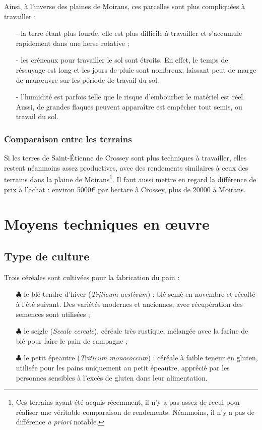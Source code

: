 \documentclass{article}
\begin{document}
Ainsi, à l'inverse des plaines de Moirans, ces parcelles sont plus compliquées à travailler : 
\begin{itemize}
	\item[- ] la terre étant plus lourde, elle est plus difficile à travailler et s'accumule rapidement dans une herse rotative ;
	\item[- ] les créneaux pour travailler le sol sont étroits. En effet, le temps de réssuyage est long et les jours de pluie sont nombreux, laissant peut de marge de manœuvre sur les période de travail du sol. 
	\item[- ] l'humidité est parfois telle que le risque d'embourber le matériel est réel. Aussi, de grandes flaques peuvent apparaître est empêcher tout semis, ou travail du sol.
\end{itemize}

\subsubsection*{Comparaison entre les terrains}

Si les terres de Saint-Étienne de Crossey sont plus techniques à travailler, elles restent néanmoins assez productives, avec des rendements similaires à ceux des terrains dans la plaine de Moirans\footnote{Ces terrains ayant été acquis récemment, il n'y a pas assez de recul pour réaliser une véritable comparaison de rendements. Néanmoins, il n'y a pas de différence \textit{a priori} notable.}. Il faut aussi mettre en regard la différence de prix à l'achat : environ 5000\euro{} par hectare à Crossey, plus de 20000 à Moirans. 

\section{Moyens techniques en œuvre}

\subsection{Type de culture}

Trois céréales sont cultivées pour la fabrication du pain :

\begin{itemize}
\item[$\clubsuit$] le blé tendre d'hiver (\textit{Triticum aestivum}) : blé semé en novembre et récolté à l'été suivant. Des variétés modernes et anciennes, avec récupération des semences sont utilisées ;
\item[$\clubsuit$] le seigle (\textit{Secale cereale}), céréale très rustique, mélangée avec la farine de blé pour faire le pain de campagne ;
\item[$\clubsuit$] le petit épeautre (\textit{Triticum monococcum}) : céréale à faible teneur en gluten, utilisée pour les pains uniquement au petit épeautre, apprécié par les personnes sensibles à l'excès de gluten dans leur alimentation.
\end{itemize}
\end{document}
